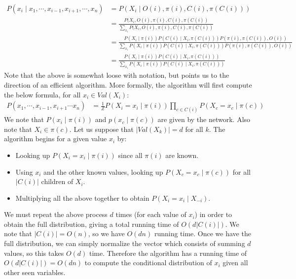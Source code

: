 \documentclass[12pt]{article}
\begin{document}
\begin{enumerate}
\begin{align*}
P(x_i \mid x_1, \cdots, x_{i-1}, x_{i+1}, \cdots, x_n) &= P(X_i \mid O(i), \pi(i), C(i), \pi(C(i))) \tag{definition plus some lose notation} \\
&= \frac{P(X_i, O(i), \pi(i), C(i), \pi(C(i))}{\sum_{x_i} P(X_i, O(i), \pi(i), C(i), \pi(C(i))} \tag{Bayes Rule} \\
&= \frac{P(X_i \mid \pi(i))P(C(i) \mid X_i, \pi(C(i)))P(\pi(i), \pi(C(i)), O(i))}{\sum_{x_i} P(X_i \mid \pi(i))P(C(i) \mid X_i, \pi(C(i)))P(\pi(i), \pi(C(i)), O(i))} \tag{Partial application of Chain rule on structure of network} \\
&= \frac{P(X_i \mid \pi(i))P(C(i) \mid X_i, \pi(C(i)))}{\sum_{x_i}P(X_i \mid \pi(i))P(C(i) \mid X_i, \pi(C(i)))}
\end{align*}
Note that the above is somewhat loose with notation, but points us to the direction of an efficient algorithm. More formally, the algorithm will first compute the below formula, for all $x_i \in Val(X_i)$:
\begin{align*}
P(x_1, \cdots, x_{i-1}, x_{i+1} \cdots x_n) &= \frac{1}{Z} P(X_i = x_i \mid \pi(i)) \prod_{c \in C(i)} P(X_c = x_c \mid \pi(c))
\end{align*}
We note that $P(x_i \mid \pi(i))$ and $p(x_c \mid \pi(c))$ are given by the network. Also note that $X_i \in \pi(c)$. Let us suppose that $|Val(X_k)| = d$ for all $k$. The algorithm begins for a given value $x_i$ by:
\begin{itemize}
\item Looking up $P(X_i = x_i \mid \pi(i))$ since all $\pi(i)$ are known.
\item Using $x_i$ and the other known values, looking up $P(X_c = x_c \mid \pi(c))$ for all $|C(i)|$ children of $X_i$.
\item Multiplying all the above together to obtain $P(X_i = x_i \mid X_{-i})$.
\end{itemize}
We must repeat the above process $d$ times (for each value of $x_i$) in order to obtain the full distribution, giving a total running time of $O(d|C(i)|)$. We note that $|C(i)| = O(n)$, so we have $O(dn)$ running time. Once we have the full distribution, we can simply normalize the vector which consists of summing $d$ values, so this takes $O(d)$ time. Therefore the algorithm has a running time of $O(d|C(i)|) = O(dn)$ to compute the conditional distribution of $x_i$ given all other seen variables. 


\end{enumerate}
\end{document}

